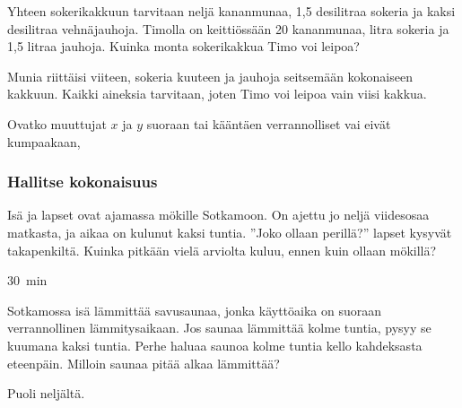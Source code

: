 \begin{tehtavasivu}
\begin{tehtava}
Yhteen sokerikakkuun tarvitaan neljä kananmunaa, 1,5 desilitraa sokeria ja kaksi desilitraa vehnäjauhoja. Timolla on keittiössään 20 kananmunaa, litra sokeria ja 1,5 litraa jauhoja. Kuinka monta sokerikakkua Timo voi leipoa?  
\begin{vastaus}
Munia riittäisi viiteen, sokeria kuuteen ja jauhoja seitsemään kokonaiseen kakkuun. Kaikki aineksia tarvitaan, joten Timo voi leipoa vain viisi kakkua.
\end{vastaus}
\end{tehtava}

\begin{tehtava}
Ovatko muuttujat $ x $ ja $ y $ suoraan tai kääntäen verrannolliset vai eivät kumpaakaan,
\begin{alakohdat}
\end{alakohdat}
\begin{vastaus}
\begin{alakohdat}
\end{alakohdat}
\end{vastaus}
\end{tehtava}

\subsubsection*{Hallitse kokonaisuus}

\begin{tehtava}
    Isä ja lapset ovat ajamassa mökille Sotkamoon. On ajettu jo neljä
    viidesosaa matkasta, ja aikaa on kulunut kaksi tuntia. ''Joko ollaan perillä?''
    lapset kysyvät takapenkiltä. Kuinka pitkään vielä arviolta kuluu, ennen
    kuin ollaan mökillä?
    
    \begin{vastaus}
        $30$~min
    \end{vastaus}
\end{tehtava}

\begin{tehtava}
Sotkamossa isä lämmittää savusaunaa, jonka käyttöaika on suoraan verrannollinen lämmitysaikaan. Jos saunaa lämmittää kolme tuntia, pysyy se kuumana kaksi tuntia. Perhe haluaa saunoa kolme tuntia kello kahdeksasta eteenpäin. Milloin saunaa pitää alkaa lämmittää?
\begin{vastaus}
Puoli neljältä.
\end{vastaus}
\end{tehtava}


\end{tehtavasivu}
